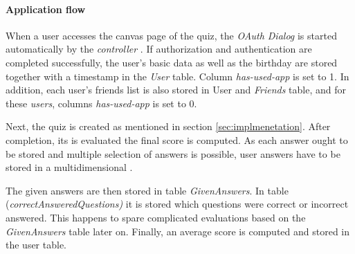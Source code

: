\documentclass[preprint,12pt]{elsarticle}
\begin{document}
\paragraph{Application flow}
\label{sec:application-flow}
When a user accesses the canvas page of the quiz, 
the \textit{OAuth Dialog} is started automatically by the
\textit{controller} . If authorization and authentication are completed
successfully, the user's basic data as well as the birthday are stored together with
a timestamp in the \textit{User} table. Column \textit{has-used-app} is set to 1. In
addition, each user's friends list is also stored in \textup{User} and
\textit{Friends} table, and for these \textit{users}, columns
\textit{has-used-app} is set to 0. 

Next, the quiz is created as mentioned in section
\ref{sec:implmenetation}.
After completion, its is evaluated the final score is computed. As
each answer ought to be stored and multiple selection of answers is 
possible, user answers have to be stored in  a multidimensional . 

The given answers are then stored in table \textit{GivenAnswers}. In
table (\textit{correctAnsweredQuestions)} it is stored which questions
were correct or incorrect answered. This happens to spare complicated
evaluations based on the \textit{GivenAnswers} table later on.
Finally, an average score is computed and stored in the user table.

\end{document}
